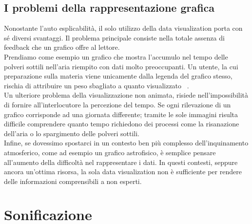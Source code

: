 \subsection{I problemi della rappresentazione grafica}
Nonostante l’auto esplicabilità, il solo utilizzo della data visualization porta con sé diversi svantaggi. 
Il problema principale consiste nella totale assenza di feedback che un grafico offre al lettore.
\\
Prendiamo come esempio un grafico che mostra l'accumulo nel tempo delle polveri sottili nell'aria riempito con dati molto preoccupanti. 
Un utente, la cui preparazione sulla materia viene unicamente dalla legenda del grafico stesso, rischia di attribuire un peso sbagliato a quanto visualizzato ~\cite{disadvantages}.
\\ 
Un ulteriore problema della visualizzazione non animata, risiede nell'impossibilità di fornire all’interlocutore la percezione del tempo. 
Se ogni rilevazione di un grafico corrisponde ad una giornata differente; tramite le sole immagini risulta difficile comprendere quanto tempo richiedono dei processi come la risanazione dell'aria o lo spargimento delle polveri sottili.
\\ 
Infine, se dovessimo spostarci in un contesto ben più complesso dell’inquinamento atmosferico, come ad esempio un grafico astrofisico, è semplice pensare all’aumento della difficoltà nel rappresentare i dati. 
In questi contesti, seppure ancora un'ottima risorsa, la sola data visualization non è sufficiente per rendere delle informazioni comprensibili a non esperti.


\section{Sonificazione}
